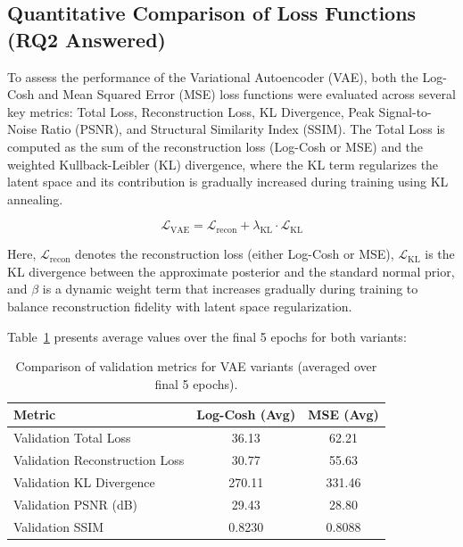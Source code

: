 \subsection{Quantitative Comparison of Loss Functions (RQ2 Answered)} \label{subsec:vae_quant_comparison}
To assess the performance of the Variational Autoencoder (VAE), both the Log-Cosh and Mean Squared Error (MSE) loss functions were evaluated across several key metrics: Total Loss, Reconstruction Loss, KL Divergence, Peak Signal-to-Noise Ratio (PSNR), and Structural Similarity Index (SSIM). The Total Loss is computed as the sum of the reconstruction loss (Log-Cosh or MSE) and the weighted Kullback-Leibler (KL) divergence, where the KL term regularizes the latent space and its contribution is gradually increased during training using KL annealing.

\begin{equation}
\mathcal{L}_{\text{VAE}} = \mathcal{L}_{\text{recon}} + \lambda_{\text{KL}} \cdot \mathcal{L}_{\text{KL}}
\end{equation}

Here, $\mathcal{L}_{\text{recon}}$ denotes the reconstruction loss (either Log-Cosh or MSE), $\mathcal{L}_{\text{KL}}$ is the KL divergence between the approximate posterior and the standard normal prior, and $\beta$ is a dynamic weight term that increases gradually during training to balance reconstruction fidelity with latent space regularization.

Table~\ref{tab:loss_comparison} presents average values over the final 5 epochs for both variants:

\begin{table}[h]
    \centering
    \begin{tabular}{lcc}
        \toprule
        \textbf{Metric} & \textbf{Log-Cosh (Avg)} & \textbf{MSE (Avg)} \\
        \midrule
        Validation Total Loss & 36.13 & 62.21 \\
        Validation Reconstruction Loss & 30.77 & 55.63 \\
        Validation KL Divergence & 270.11 & 331.46 \\
        Validation PSNR (dB) & 29.43 & 28.80 \\
        Validation SSIM & 0.8230 & 0.8088 \\
        \bottomrule
    \end{tabular}
    \caption{Comparison of validation metrics for VAE variants (averaged over final 5 epochs).}
    \label{tab:loss_comparison}
\end{table}

